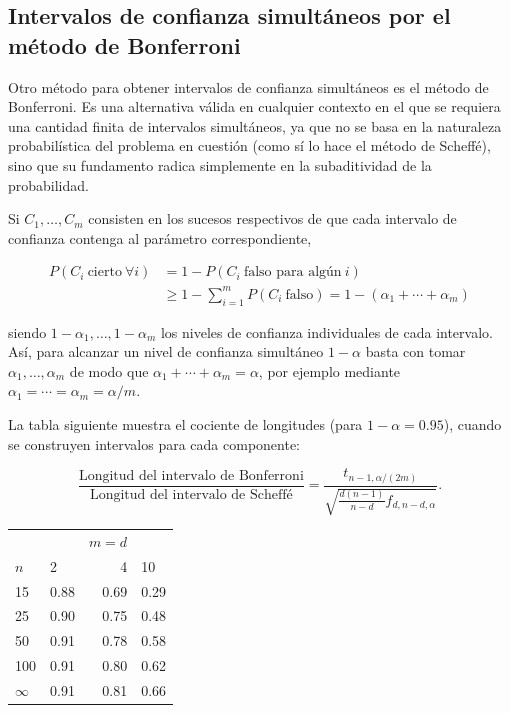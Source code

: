 \documentclass[
  a4paper,
  oneside]{scrbook}
\newcounter{none} %
\theoremstyle{definition}
\theoremstyle{definition}
\theoremstyle{definition}
\theoremstyle{definition}
\theoremstyle{remark}
\begin{document}
\subsection{Intervalos de confianza simultáneos por el método de Bonferroni}\label{intervalos-de-confianza-simultaneos-por-el-metodo-de-bonferroni}

Otro método para obtener intervalos de confianza simultáneos es el
método de Bonferroni. Es una alternativa válida en cualquier contexto en
el que se requiera una cantidad finita de intervalos simultáneos, ya que
no se basa en la naturaleza probabilística del problema en cuestión
(como sí lo hace el método de Scheffé), sino que su fundamento radica
simplemente en la subaditividad de la probabilidad.

Si \(C_1,\ldots,C_m\) consisten en los sucesos respectivos de que cada
intervalo de confianza contenga al parámetro correspondiente,

\[\begin{aligned}
P(C_i\ \mbox{cierto}\ \forall i) &= 1-P(C_i\ \mbox{falso para algún}\ i) \\
&\geq  1-\sum_{i=1}^m P(C_i\ \mbox{falso})=1-\left(\alpha_1+\cdots +\alpha_m\right)\end{aligned}\]

siendo \(1-\alpha_1,\ldots,1-\alpha_m\) los niveles de confianza
individuales de cada intervalo. Así, para alcanzar un nivel de confianza
simultáneo \(1-\alpha\) basta con tomar \(\alpha_1,\ldots,\alpha_m\) de modo
que \(\alpha_1+\cdots+\alpha_m=\alpha\), por ejemplo mediante
\(\alpha_1=\cdots=\alpha_m=\alpha/m\).

La tabla siguiente muestra el cociente de longitudes (para
\(1-\alpha=0.95\)), cuando se construyen intervalos para cada componente:

\[\frac{\mbox{Longitud del intervalo de Bonferroni}}
{\mbox{Longitud del intervalo de Scheffé}}
=\frac{t_{n-1,\alpha/(2m)}}{\sqrt{\frac{d(n-1)}{n-d}f_{d,n-d,\alpha}}}.\]

{\def\LTcaptype{none} %
\begin{longtable}[]{@{}llrl@{}}
\toprule\noalign{}
\endhead
\bottomrule\noalign{}
\endlastfoot
& & \(m=d\) & \\
\(n\) & 2 & 4 & 10 \\
15 & 0.88 & 0.69 & 0.29 \\
25 & 0.90 & 0.75 & 0.48 \\
50 & 0.91 & 0.78 & 0.58 \\
100 & 0.91 & 0.80 & 0.62 \\
\(\infty\) & 0.91 & 0.81 & 0.66 \\
\end{longtable}
}
\end{document}

